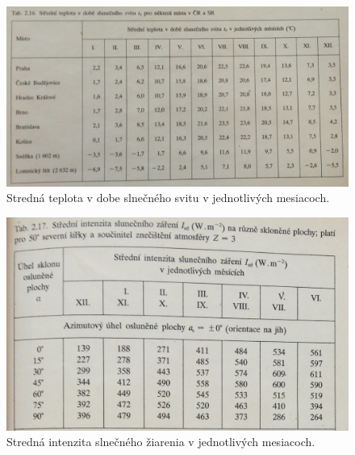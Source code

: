 \documentclass[a4paper, 11pt]{article}
\begin{document}
\begin{figure}[H] 
\centering
\includegraphics[width=.7\paperwidth]{images/str50.png}
\caption{Stredná teplota v dobe slnečného svitu v jednotlivých mesiacoch.}
\label{str50}
\end{figure}

\begin{figure}[H] 
\centering
\includegraphics[width=.7\paperwidth]{images/str51.png}
\caption{Stredná intenzita slnečného žiarenia v jednotlivých mesiacoch.}
\label{str51}
\end{figure}
\end{document}
